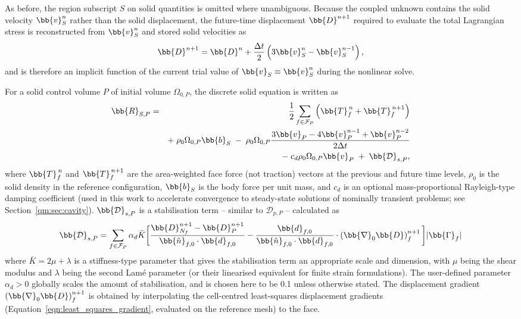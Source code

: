 As before, the region subscript $S$ on solid quantities is omitted where unambiguous. Because the coupled unknown contains the solid velocity $\bb{v}_S^n$ rather than the solid displacement, the future-time displacement $\bb{D}^{n+1}$ required to evaluate the total Lagrangian stress is reconstructed from $\bb{v}_S^n$ and stored solid velocities as
\begin{equation}
    \bb{D}^{n+1}
    =
    \bb{D}^{n}
    +
    \frac{\Delta t}{2}
    \left(
    3\bb{v}_S^n
    -
    \bb{v}_S^{n-1}
    \right),
    \label{qm:eqn:solid_future_displacement}
\end{equation}
and is therefore an implicit function of the current trial value of $\bb{v}_S \equiv \bb{v}_S^n$ during the nonlinear solve.

For a solid control volume $P$ of initial volume $\Omega_{0,P}$, the discrete solid equation is written as
\begin{eqnarray}
    \bb{R}_{S,P}
    &=&
    \frac{1}{2}
    \sum_{f \in \mathcal{F}_P}
    \left(
    \bb{T}^{\,n}_f
    +
    \bb{T}^{\,n+1}_f
    \right) \notag \\
    && 
    +  \; \rho_0 \Omega_{0,P}   \bb{b}_S
    \;-\;
    \rho_0 \Omega_{0,P}
        \frac{
    3\bb{v}_P
    -
    4\bb{v}^{n-1}_P
    +
    \bb{v}^{n-2}_P
    }
    {2\Delta t} \notag \\
    &&
    - \; 
    c_d \rho_0 \Omega_{0,P} \bb{v}_{P}
        \;+\;
    \bb{\mathcal{D}}_{s,P},
    \label{qm:eqn:solid_velocity_residual}
\end{eqnarray}
where $\bb{T}^{\,n}_f$ and $\bb{T}^{\,n+1}_f$ are the area-weighted face force (not traction) vectors at the previous and future time levels, $\rho_0$ is the solid density in the reference configuration, $\bb{b}_S$ is the body force per unit mass, 
and $c_d$ is an optional mass-proportional Rayleigh-type damping coefficient (used in this work to accelerate convergence to steady-state solutions of nominally transient problems; see Section~\ref{qm:sec:cavity}).
$\bb{\mathcal{D}}_{s,P}$ is a stabilisation term -- similar to $\mathcal{D}_{p,P}$ -- calculated as
\begin{eqnarray} \label{qm:eqn:rhie_chow_s}
	\bb{\mathcal{D}}_{s,P}
	=
	\sum_{f \in \mathcal{F}_P}
	\alpha_d \bar{K}
        \bigg[
	\frac{\bb{D}^{n+1}_{N_f} - \bb{D}^{n+1}_{P}}{\bb{\hat{n}}_{f,0} \cdot \bb{d}_{f,0}}
       -
       \frac{\bb{d}_{f,0}}{\bb{\hat{n}}_{f,0} \cdot \bb{d}_{f,0}} \cdot \left( \bb{\nabla}_0 \bb{D} \right)^{n+1}_f
    \bigg]
    |\bb{\Gamma}_f|
\end{eqnarray}
where $\bar{K} = 2\mu + \lambda$ is a stiffness-type parameter that gives the stabilisation term an appropriate scale and dimension, with $\mu$ being the shear modulus and $\lambda$ being the second Lamé parameter (or their linearised equivalent for finite strain formulations).
The user-defined parameter $\alpha_d > 0$ globally scales the amount of stabilisation, and is chosen here to be 0.1 unless otherwise stated.
The displacement gradient $\left( \bb{\nabla}_0 \bb{D} \right)^{n+1}_f$ is obtained by interpolating the cell-centred least-squares displacement gradients (Equation~\eqref{eqn:least_squares_gradient}, evaluated on the reference mesh) to the face.

